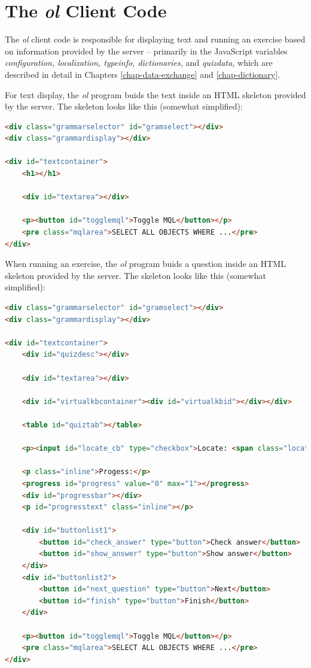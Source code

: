 \documentclass[11pt,oneside,a4paper]{memoir}
\begin{document}
\section{The \emph{ol} Client Code}\label{sec-ol}

The \emph{ol} client code is responsible for displaying text and running an exercise based on
information provided by the server -- primarily in the JavaScript variables \emph{configuration,
  localization, typeinfo, dictionaries,} and \emph{quizdata,} which are described in detail in
Chapters \ref{chap-data-exchange} and \ref{chap-dictionary}.

For text display, the \emph{ol} program buids the text inside an HTML skeleton provided by the
server. The skeleton looks like this (somewhat simplified):


\begin{lstlisting}[language=HTML]
<div class="grammarselector" id="gramselect"></div>
<div class="grammardisplay"></div>
 
<div id="textcontainer">
    <h1></h1>
   
    <div id="textarea"></div>

    <p><button id="togglemql">Toggle MQL</button></p>
    <pre class="mqlarea">SELECT ALL OBJECTS WHERE ...</pre>
</div>
\end{lstlisting}

When running an exercise, the \emph{ol} program buids a question inside an HTML skeleton provided by the
server. The skeleton looks like this (somewhat simplified):

\begin{lstlisting}[language=HTML,morekeywords={progress}]
<div class="grammarselector" id="gramselect"></div>
<div class="grammardisplay"></div>
 
<div id="textcontainer">
    <div id="quizdesc"></div>
   
    <div id="textarea"></div>
 
    <div id="virtualkbcontainer"><div id="virtualkbid"></div></div>
  
    <table id="quiztab"></table>
  
    <p><input id="locate_cb" type="checkbox">Locate: <span class="location"></span></p>

    <p class="inline">Progess:</p>
    <progress id="progress" value="0" max="1"></progress>
    <div id="progressbar"></div>
    <p id="progresstext" class="inline"></p>

    <div id="buttonlist1">
        <button id="check_answer" type="button">Check answer</button>
        <button id="show_answer" type="button">Show answer</button>
    </div>
    <div id="buttonlist2">
        <button id="next_question" type="button">Next</button>
        <button id="finish" type="button">Finish</button>
    </div>

    <p><button id="togglemql">Toggle MQL</button></p>
    <pre class="mqlarea">SELECT ALL OBJECTS WHERE ...</pre>
</div>
\end{lstlisting}
  
\end{document}
